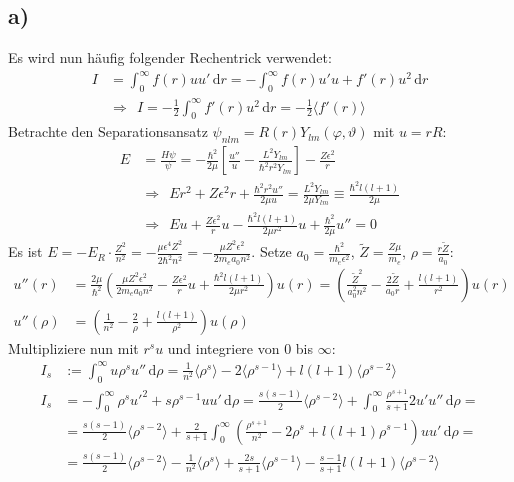 \documentclass[a4paper,12pt]{article}
\newcommand{\bra}{}
\newcommand{\intx}{}
\newcommand{\kla}{}
\newcommand{\klam}{}
\begin{document}
\subsection*{a)}
Es wird nun häufig folgender Rechentrick verwendet:
\begin{align*}
I&=\intx\int_{0}^{\infty}f(r)uu'\,\mathrm{d}r=-\intx\int_{0}^{\infty}f(r)u'u+f'(r)u^2\,\mathrm{d}r\\ 
&\Rightarrow\ \ I=-\frac{1}{2}\intx\int_{0}^{\infty}f'(r)u^2\,\mathrm{d}r=-\frac{1}{2}\bra\langle {f'(r)}\rangle
\end{align*}
Betrachte den Separationsansatz $\psi_{nlm}=R(r)Y_{lm}(\varphi,\vartheta)$ mit $u=rR$:
\begin{align*}
E&=\frac{H\psi}{\psi}=-\frac{\hbar^2}{2\mu}\klam\left[ {\frac{u''}{u}-\frac{L^2Y_{lm}}{\hbar^2r^2Y_{lm}}} \right]-\frac{Z\epsilon^2}{r}\\
&\Rightarrow\ \ Er^2+Z\epsilon^2r+\frac{\hbar^2r^2u''}{2\mu u}=\frac{L^2Y_{lm}}{2\mu Y_{lm}}\equiv\frac{\hbar^2l(l+1)}{2\mu}\\
&\Rightarrow\ \ Eu+\frac{Z\epsilon^2}{r}u-\frac{\hbar^2l(l+1)}{2\mu r^2}u+\frac{\hbar^2}{2\mu}u''=0
\end{align*}
Es ist $E=-E_R\cdot\frac{Z^2}{n^2}=-\frac{\mu \epsilon^4Z^2}{2\hbar^2n^2}=-\frac{\mu Z^2\epsilon^2}{2m_ea_0n^2}$. Setze $a_0=\frac{\hbar^2}{m_e\epsilon^2}$, $\tilde{Z}=\frac{Z\mu }{m_e}$, $\rho=\frac{r\tilde{Z}}{a_0}$:
\begin{align*}
u''(r)&=\frac{2\mu }{\hbar^2}\kla\left( {\frac{\mu Z^2\epsilon^2}{2m_ea_0n^2}-\frac{Z\epsilon^2}{r}u+\frac{\hbar^2l(l+1)}{2\mu r^2}} \right)u(r)=\kla\left( {\frac{\tilde{Z}^2}{a_0^2n^2}-\frac{2\tilde{Z}}{a_0r}+\frac{l(l+1)}{r^2}} \right)u(r)\\
u''(\rho)&=\kla\left( {\frac{1}{n^2}-\frac{2}{\rho}+\frac{l(l+1)}{\rho^2}} \right)u(\rho)
\end{align*}
Multipliziere nun mit $r^su$ und integriere von $0$ bis $\infty$:
\begin{align*}
I_s&:=\intx\int_{0}^{\infty}u\rho^su''\,\mathrm{d}\rho=\frac{1}{n^2}\bra\langle {\rho^s}\rangle-2\bra\langle {\rho^{s-1}}\rangle+l(l+1)\bra\langle {\rho^{s-2}}\rangle\\
I_s&=-\intx\int_{0}^{\infty}\rho^su'^2+s\rho^{s-1}uu'\,\mathrm{d}\rho=\frac{s(s-1)}{2}\bra\langle {\rho^{s-2}}\rangle+\intx\int_{0}^{\infty}\frac{\rho^{s+1}}{s+1}2u'u''\,\mathrm{d}\rho=\\
&=\frac{s(s-1)}{2}\bra\langle {\rho^{s-2}}\rangle+\frac{2}{s+1}\intx\int_{0}^{\infty}\kla\left( {\frac{\rho^{s+1}}{n^2}-2\rho^s+l(l+1)\rho^{s-1}} \right)uu'\,\mathrm{d}\rho=\\
&=\frac{s(s-1)}{2}\bra\langle {\rho^{s-2}}\rangle-\frac{1}{n^2}\bra\langle {\rho^s}\rangle+\frac{2s}{s+1}\bra\langle {\rho^{s-1}}\rangle-\frac{s-1}{s+1}l(l+1)\bra\langle {\rho^{s-2}}\rangle
\end{align*}
\end{document}
